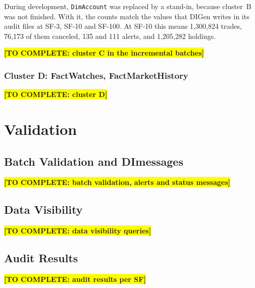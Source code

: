 \documentclass[11pt,a4paper]{article}
\newcommand{\code}[1]{\texttt{#1}}           %
\newcommand{\todo}[1]{\colorbox{yellow}{\textbf{[TO COMPLETE: #1]}}}
\begin{document}
During development, \code{DimAccount} was replaced by a stand-in, because
cluster~B was not finished. With it, the counts match the values that DIGen
writes in its audit files at SF-3, SF-10 and SF-100. At SF-10 this means
1{,}300{,}824 trades, 76{,}173 of them canceled, 135 and 111 alerts, and
1{,}205{,}282 holdings.

\todo{cluster C in the incremental batches}

\subsubsection{Cluster D: FactWatches, FactMarketHistory}
\todo{cluster D}

\section{Validation}
\label{sec:validation}

\subsection{Batch Validation and DImessages}
\todo{batch validation, alerts and status messages}

\subsection{Data Visibility}
\todo{data visibility queries}

\subsection{Audit Results}
\todo{audit results per SF}
\end{document}
